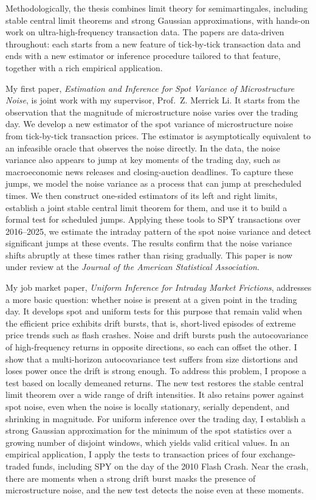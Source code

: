 \documentclass[12pt,a4paper]{article}
\begin{document}
Methodologically, the thesis combines limit theory for semimartingales,
including stable central limit theorems and strong Gaussian approximations,
with hands-on work on ultra-high-frequency transaction data.
The papers are data-driven throughout: each starts from a new feature of
tick-by-tick transaction data and ends with a new estimator or inference procedure
tailored to that feature, together with a rich empirical application.

My first paper, \textit{Estimation and Inference for Spot Variance of Microstructure Noise},
is joint work with my supervisor, Prof.~Z. Merrick Li.
It starts from the observation that the magnitude of microstructure noise
varies over the trading day.
We develop a new estimator of the spot variance of microstructure noise
from tick-by-tick transaction prices.
The estimator is asymptotically equivalent to an infeasible oracle
that observes the noise directly.
In the data, the noise variance also appears to jump at key moments of the trading day,
such as macroeconomic news releases and closing-auction deadlines.
To capture these jumps, we model the noise variance as a process
that can jump at prescheduled times.
We then construct one-sided estimators of its left and right limits,
establish a joint stable central limit theorem for them,
and use it to build a formal test for scheduled jumps.
Applying these tools to SPY transactions over 2016--2025,
we estimate the intraday pattern of the spot noise variance
and detect significant jumps at these events.
The results confirm that the noise variance shifts abruptly at these times
rather than rising gradually. This paper is now under review at the 
\textit{Journal of the American Statistical Association}.


My job market paper, \textit{Uniform Inference for Intraday Market Frictions},
addresses a more basic question: whether noise is present at a given point in the trading day.
It develops spot and uniform tests for this purpose
that remain valid when the efficient price exhibits drift bursts,
that is, short-lived episodes of extreme price trends such as flash crashes.
Noise and drift bursts push the autocovariance of high-frequency returns
in opposite directions, so each can offset the other.
I show that a multi-horizon autocovariance test suffers from size distortions
and loses power once the drift is strong enough.
To address this problem, I propose a test based on locally demeaned returns.
The new test restores the stable central limit theorem
over a wide range of drift intensities.
It also retains power against spot noise, even when the noise is
locally stationary, serially dependent, and shrinking in magnitude.
For uniform inference over the trading day,
I establish a strong Gaussian approximation for the minimum of the spot statistics
over a growing number of disjoint windows, which yields valid critical values.
In an empirical application, I apply the tests to transaction prices
of four exchange-traded funds, including SPY on the day of the 2010 Flash Crash.
Near the crash, there are moments when a strong drift burst masks
the presence of microstructure noise, and the new test detects the noise even at these moments.
\end{document}

